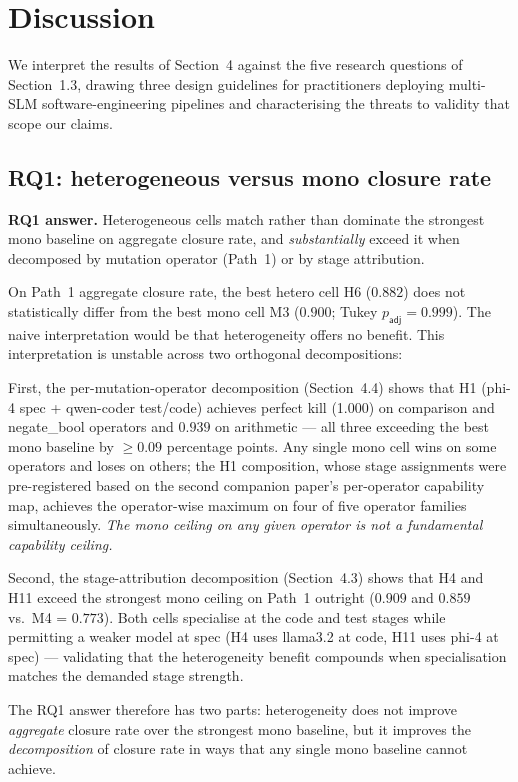 \section{Discussion}
\label{sec:discussion}

We interpret the results of Section~4 against the five research questions of Section~1.3, drawing three design guidelines for practitioners deploying multi-SLM software-engineering pipelines and characterising the threats to validity that scope our claims.

\subsection{RQ1: heterogeneous versus mono closure rate}

\textbf{RQ1 answer.} Heterogeneous cells match rather than dominate the strongest mono baseline on aggregate closure rate, and \emph{substantially} exceed it when decomposed by mutation operator (Path~1) or by stage attribution.

On Path~1 aggregate closure rate, the best hetero cell H6 ($0.882$) does not statistically differ from the best mono cell M3 ($0.900$; Tukey $p_{\textsf{adj}} = 0.999$). The naive interpretation would be that heterogeneity offers no benefit. This interpretation is unstable across two orthogonal decompositions:

First, the per-mutation-operator decomposition (Section~4.4) shows that H1 (phi-4 spec + qwen-coder test/code) achieves perfect kill (1.000) on comparison and negate\_bool operators and $0.939$ on arithmetic --- all three exceeding the best mono baseline by $\geq 0.09$ percentage points. Any single mono cell wins on some operators and loses on others; the H1 composition, whose stage assignments were pre-registered based on the second companion paper's per-operator capability map, achieves the operator-wise maximum on four of five operator families simultaneously. \emph{The mono ceiling on any given operator is not a fundamental capability ceiling.}

Second, the stage-attribution decomposition (Section~4.3) shows that H4 and H11 exceed the strongest mono ceiling on Path~1 outright ($0.909$ and $0.859$ vs.\ M4 = $0.773$). Both cells specialise at the code and test stages while permitting a weaker model at spec (H4 uses llama3.2 at code, H11 uses phi-4 at spec) --- validating that the heterogeneity benefit compounds when specialisation matches the demanded stage strength.

The RQ1 answer therefore has two parts: heterogeneity does not improve \emph{aggregate} closure rate over the strongest mono baseline, but it improves the \emph{decomposition} of closure rate in ways that any single mono baseline cannot achieve.

